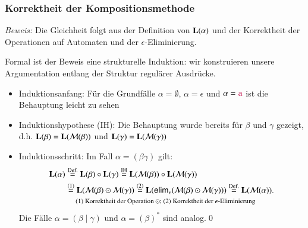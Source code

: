 \documentclass[onlymath]{beamer}
\begin{document}
\begin{frame}\frametitle{Korrektheit der Kompositionsmethode}

\pause

\emph{Beweis:} Die Gleichheit folgt aus der Definition von $\textbf{\textcolor{black}{L}}(\alpha)$ und der Korrektheit der Operationen auf Automaten und der $\epsilon$-Eliminierung.\pause
\medskip

Formal ist der Beweis eine \alert{strukturelle Induktion}: wir konstruieren unsere Argumentation entlang der Struktur regulärer Ausdrücke.\pause
\begin{itemize}
\item \alert{Induktionsanfang:} Für die Grundfälle $\alpha=\emptyset$, $\alpha=\epsilon$ und $\alpha=\mathtt{\textcolor{purple}{a}}$ ist die Behauptung leicht zu sehen\pause
\item \alert{Induktionshypothese (IH):} Die Behauptung wurde bereits für $\beta$ und $\gamma$ gezeigt, d.h. $\textbf{\textcolor{black}{L}}(\beta)=\textbf{\textcolor{black}{L}}(\mathcal{M}(\beta))$ und $\textbf{\textcolor{black}{L}}(\gamma)=\textbf{\textcolor{black}{L}}(\mathcal{M}(\gamma))$\pause
\item \alert{Induktionsschritt:} Im Fall $\alpha=(\beta\gamma)$ gilt:
% 
\begin{align*}
	\Slang{L}(\alpha) &\stackrel{\text{Def.}}{=}\Slang{L}(\beta)\circ\Slang{L}(\gamma)\stackrel{\text{IH}}{=}\Slang{L}(\Smach{M}(\beta))\circ\Slang{L}(\Smach{M}(\gamma))\\
	& \stackrel{\text{(1)}}{=} \Slang{L}(\Smach{M}(\beta)\odot\Smach{M}(\gamma))\stackrel{\text{(2)}}{=}\Slang{L}(\textsf{elim}_\epsilon(\Smach{M}(\beta)\odot\Smach{M}(\gamma)))\stackrel{\text{Def.}}{=}\Slang{L}(\Smach{M}(\alpha)).\\[-0.5ex]
	& ~~~~~\scalebox{0.8}{(1) Korrektheit der Operation $\odot$; (2) Korrektheit der $\epsilon$-Eliminierung}
\end{align*}%
% 
Die Fälle $\alpha=(\beta\mid\gamma)$ und $\alpha=(\beta)^*$ sind analog.\qed
\end{itemize}

\end{frame}
\end{document}
